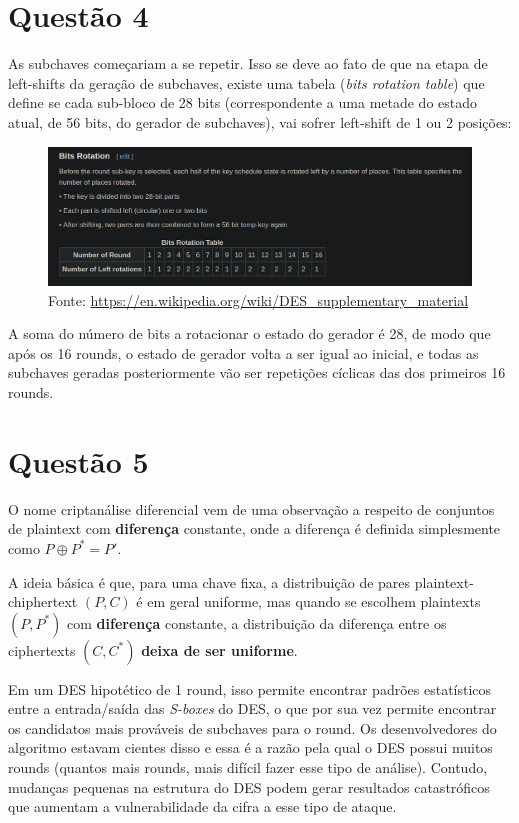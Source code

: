 \documentclass{article}
\begin{document}
\section*{Questão 4}

As subchaves começariam a se repetir. Isso se deve ao fato de que na etapa de left-shifts da geração de subchaves, existe uma tabela (\textit{bits rotation table}) que define se cada sub-bloco de 28 bits (correspondente a uma metade do estado atual, de 56 bits, do gerador de subchaves), vai sofrer left-shift de 1 ou 2 posições:

\newpage
\FloatBarrier
\begin{figure}[!ht]
    \begin{center}
        \includegraphics[width=\textwidth]{images/bit-rotation-table.png}
        \caption{Fonte: \url{https://en.wikipedia.org/wiki/DES_supplementary_material}}
    \end{center}
\end{figure} 

A soma do número de bits a rotacionar o estado do gerador é 28, de modo que após os 16 rounds, o estado de gerador volta a ser igual ao inicial, e todas as subchaves geradas posteriormente vão ser repetições cíclicas das dos primeiros 16 rounds.

\section*{Questão 5}

O nome criptanálise diferencial vem de uma observação a respeito de conjuntos de plaintext com \textbf{diferença} constante, onde a diferença é definida simplesmente como $P \oplus P^* = P'$.

A ideia básica é que, para uma chave fixa, a distribuição de pares plaintext-chiphertext $(P, C)$ é em geral uniforme, mas quando se escolhem plaintexts $(P, P^*)$ com \textbf{diferença} constante, a distribuição da diferença entre os ciphertexts $(C, C^*)$ \textbf{deixa de ser uniforme}.

Em um DES hipotético de 1 round, isso permite encontrar padrões estatísticos entre a entrada/saída das \textit{S-boxes} do DES, o que por sua vez permite encontrar os candidatos mais prováveis de subchaves para o round. Os desenvolvedores do algoritmo estavam cientes disso e essa é a razão pela qual o DES possui muitos rounds (quantos mais rounds, mais difícil fazer esse tipo de análise). Contudo, mudanças pequenas na estrutura do DES podem gerar resultados catastróficos que aumentam a vulnerabilidade da cifra a esse tipo de ataque.
\end{document}
